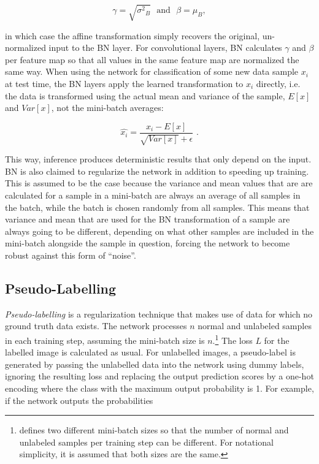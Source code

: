 \[ \gamma = \sqrt{{\sigma^2}_B} \,\,\text{ and } \,\, \beta = \mu_B ,\]

\noindent in which case the affine transformation simply recovers the original, un-normalized input to the BN layer. For convolutional layers, BN calculates $\gamma$ and $\beta$ per feature map so that all values in the same feature map are normalized the same way. When using the network for classification of some new data sample $x_i$ at test time, the BN layers apply the learned transformation to $x_i$ directly, i.e. the data is transformed using the actual mean and variance of the sample, $E[x]$ and $Var[x]$, not the mini-batch averages:

\[  \hat{x_i} = \frac{x_i - E[x]}{\sqrt{Var[x]} + \epsilon}\,\,  . \]

\noindent This way, inference produces deterministic results that only depend on the input.\\

\noindent BN is also claimed to regularize the network in addition to speeding up training. This is assumed to be the case because the variance and mean values that are are calculated for a sample in a mini-batch are always an average of all samples in the batch, while the batch is chosen randomly from all samples. This means that variance and mean that are used for the BN transformation of a sample are always going to be different, depending on what other samples are included in the mini-batch alongside the sample in question, forcing the network to become robust against this form of ``noise''.


	\subsection {Pseudo-Labelling}
\label{subsec:pseudo_label}
\textit{Pseudo-labelling} \cite{pseudo_label} is a regularization technique that makes use of data for which no ground truth data exists. The network processes $n$ normal and unlabeled samples in each training step, assuming the mini-batch size is $n$.\footnote{\cite{pseudo_label} defines two different mini-batch sizes so that the number of normal and unlabeled samples per training step can be different. For notational simplicity, it is assumed that both sizes are the same.} The loss $L$ for the labelled image is calculated as usual. For unlabelled images, a pseudo-label is generated by passing the unlabelled data into the network using dummy labels, ignoring the resulting loss and replacing the output prediction scores by a one-hot encoding where the class with the maximum output probability is 1. For example, if the network outputs the probabilities 

